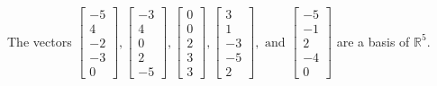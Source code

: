 \begin{exercise}
\begin{exerciseStatement}
  \end{exerciseStatement}
  \begin{exerciseAnswer}
   The vectors \(\left[\begin{array}{r}
-5 \\
4 \\
-2 \\
-3 \\
0
\end{array}\right] , \left[\begin{array}{r}
-3 \\
4 \\
0 \\
2 \\
-5
\end{array}\right] , \left[\begin{array}{r}
0 \\
0 \\
2 \\
3 \\
3
\end{array}\right] , \left[\begin{array}{r}
3 \\
1 \\
-3 \\
-5 \\
2
\end{array}\right] , \text{ and } \left[\begin{array}{r}
-5 \\
-1 \\
2 \\
-4 \\
0
\end{array}\right]\) 
  	 are  a basis of \(\mathbb{R}^5\).
  


  \end{exerciseAnswer}
\end{exercise}